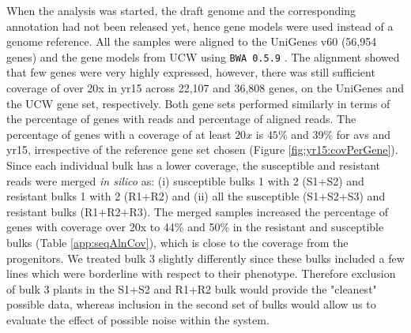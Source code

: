 

When the analysis was started, the draft genome and the corresponding annotation had not been released yet, hence gene models were used instead of a genome reference. 
All the samples were aligned to the UniGenes v60 (56,954 genes) and the gene models from UCW \citep{Krasileva2013} using \verb|BWA 0.5.9| \citep{Li2009}. 
The alignment showed that few genes were very highly expressed, however, there was still sufficient coverage of over 20x in \gls{yr15} across 22,107 and 36,808 genes, on the UniGenes and the UCW gene set, respectively. 
Both gene sets performed similarly in terms of the percentage of genes with reads and percentage of aligned reads. 
The percentage of genes with a coverage of at least $20x$ is $45\%$ and $39\%$ for \gls{avs} and \gls{yr15}, irrespective of the reference gene set chosen (Figure \ref{fig:yr15:covPerGene}).
Since each individual bulk has a lower coverage, the susceptible and resistant reads were merged \textit{in silico} as: (i) susceptible bulks 1 with 2 (S1+S2) and resistant bulks 1 with 2 (R1+R2) and (ii) all the susceptible (S1+S2+S3) and resistant bulks (R1+R2+R3). 
The merged samples increased the percentage of genes with coverage over 20x  to 44\% and 50\% in the resistant and susceptible bulks (Table \ref{app:seqAlnCov}), which is close to the coverage from the progenitors.
We treated bulk 3 slightly differently since these bulks included a few lines which were borderline with respect to their phenotype. 
Therefore exclusion of bulk 3 plants in the S1+S2 and R1+R2 bulk would provide the "cleanest" possible data, whereas inclusion in the second set of bulks would allow us to evaluate the effect of possible noise within the system. 

